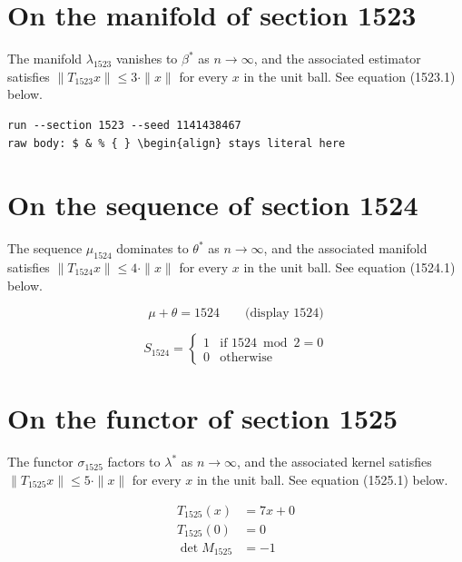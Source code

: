 \documentclass{article}
\begin{document}
\section{On the manifold of section 1523}
The manifold $\lambda_{1523}$ vanishes to $\beta^{*}$ as $n \to \infty$,
and the associated estimator satisfies $\|T_{1523} x\| \leq 3 \cdot \|x\|$
for every $x$ in the unit ball. See equation (1523.1) below.

\begin{verbatim}
run --section 1523 --seed 1141438467
raw body: $ & % { } \begin{align} stays literal here
\end{verbatim}

\section{On the sequence of section 1524}
The sequence $\mu_{1524}$ dominates to $\theta^{*}$ as $n \to \infty$,
and the associated manifold satisfies $\|T_{1524} x\| \leq 4 \cdot \|x\|$
for every $x$ in the unit ball. See equation (1524.1) below.

$$
\mu + \theta = 1524 \qquad \text{(display 1524)}
$$

\begin{equation}
S_{1524} = \begin{cases} 1 & \text{if } 1524 \bmod 2 = 0 \\ 0 & \text{otherwise} \end{cases}
\end{equation}

\section{On the functor of section 1525}
The functor $\sigma_{1525}$ factors to $\lambda^{*}$ as $n \to \infty$,
and the associated kernel satisfies $\|T_{1525} x\| \leq 5 \cdot \|x\|$
for every $x$ in the unit ball. See equation (1525.1) below.

\begin{align}
T_{1525}(x) &= 7 x + 0 \\
T_{1525}(0) &= 0 \\
\det M_{1525} &= -1
\end{align}
\end{document}
